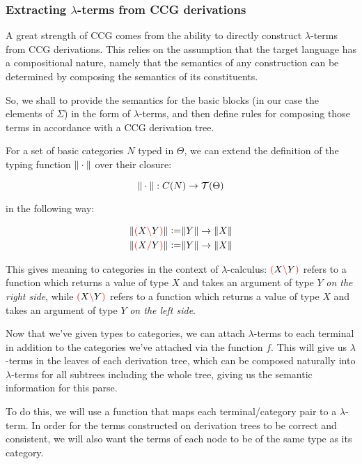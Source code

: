 \documentclass[main.tex]{subfiles}
\begin{document}
\subsubsection{Extracting $\lambda$-terms from CCG derivations}

A great strength of CCG comes from the ability to directly construct $\lambda$-terms
from CCG derivations. This relies on the assumption that the target
language has a compositional nature, namely that the semantics of any construction
can be determined by composing the semantics of its constituents.

So, we shall to provide the semantics for the basic blocks (in our case
the elements of $\Sigma$) in the form of $\lambda$-terms, and then define rules
for composing those terms in accordance with a CCG derivation tree.

\begin{defn}
    For a set of basic categories $N$ typed in $\Theta$, we can extend the
    definition of the typing function $\|\cdot\|$ over their closure:

    \[ \|\cdot\| : C(N) \rightarrow \mathcal{T}( \Theta ) \]

    in the following way:

    \begin{align*}
        \|\textcolor{red}{(} X \textcolor{red}{\backslash} Y \textcolor{red}{)}\| \vcentcolon= & \|Y\| \rightarrow \|X\| \\
        \|\textcolor{red}{(} X \textcolor{red}{/} Y \textcolor{red}{)}\| \vcentcolon= & \|Y\| \rightarrow \|X\| \\
    \end{align*}

    This gives meaning to categories in the context of $\lambda$-calculus:
    $\textcolor{red}{(} X \textcolor{red}{\backslash} Y \textcolor{red}{)}$ refers to a function which returns a value of type
    $X$ and takes an argument of type $Y$ \emph{on the right side}, while
    $\textcolor{red}{(} X \textcolor{red}{\backslash} Y \textcolor{red}{)}$ refers to a function which returns a value of type
    $X$ and takes an argument of type $Y$ \emph{on the left side}.
\end{defn}

Now that we've given types to categories, we can attach $\lambda$-terms
to each terminal in addition to the categories we've attached via the function
$f$. This will give us $\lambda$-terms in the leaves of each derivation tree,
which can be composed naturally into $\lambda$-terms for all subtrees including
the whole tree, giving us the semantic information for this parse.

To do this, we will use a function that maps each terminal/category pair
to a $\lambda$-term. In order for the terms constructed on derivation trees
to be correct and consistent, we will also want the terms of each node to be
of the same type as its category.
\end{document}
